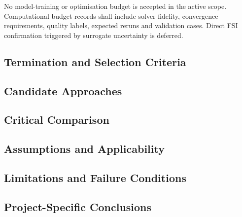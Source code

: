 No model-training or optimisation budget is accepted in the active
scope. Computational budget records shall include solver fidelity,
convergence requirements, quality labels, expected reruns and
validation cases. Direct FSI confirmation triggered by surrogate
uncertainty is deferred.

\subsection{Termination and Selection Criteria}
\label{sec:res-opt-bud-termination-selection-criteria}


\subsection{Candidate Approaches}
\label{sec:res-opt-bud-candidate-approaches}


\subsection{Critical Comparison}
\label{sec:res-opt-bud-critical-comparison}


\subsection{Assumptions and Applicability}
\label{sec:res-opt-bud-assumptions}


\subsection{Limitations and Failure Conditions}
\label{sec:res-opt-bud-limitations}


\subsection{Project-Specific Conclusions}
\label{sec:res-opt-bud-conclusions}

